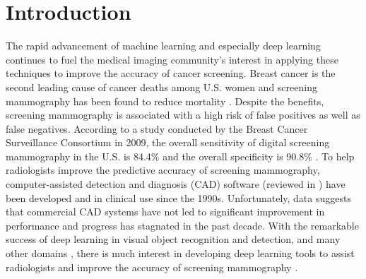 \documentclass[12pt,letterpaper]{article}
\begin{document}
\section{Introduction}
The rapid advancement of machine learning and especially deep learning continues to fuel the medical imaging community's interest in applying these techniques to improve the accuracy of cancer screening. Breast cancer is the second leading cause of cancer deaths among U.S. women \cite{american_cancer_society_how_2018} and screening mammography has been found to reduce mortality \cite{oeffinger_breast_2015}. Despite the benefits, screening mammography is associated with a high risk of false positives as well as false negatives. According to a study conducted by the Breast Cancer Surveillance Consortium in 2009, the overall sensitivity of digital screening mammography in the U.S. is 84.4\% and the overall specificity is 90.8\% \cite{breast_cancer_surveillance_consortium_performance_2009}. To help radiologists improve the predictive accuracy of screening mammography, computer-assisted detection and diagnosis (CAD) software (reviewed in \cite{elter_cadx_2009}) have been developed and in clinical use since the 1990s. Unfortunately, data suggests that commercial CAD systems have not led to significant improvement in performance \cite{fenton_influence_2007,cole_impact_2014,lehman_diagnostic_2015} and progress has stagnated in the past decade. With the remarkable success of deep learning in visual object recognition and detection, and many other domains \cite{lecun_deep_2015}, there is much interest in developing deep learning tools to assist radiologists and improve the accuracy of screening mammography \cite{aboutalib_deep_2018,kim_applying_2018,hamidinekoo_deep_2018,burt_deep_2018}.
\end{document}
